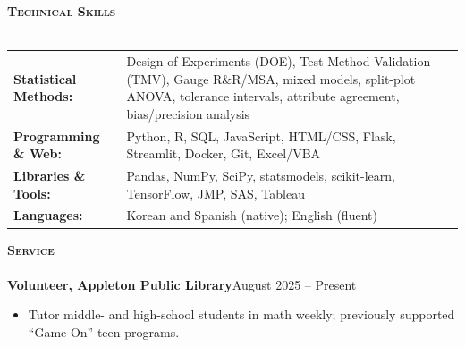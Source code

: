 \documentclass[a4paper]{article}
\newcommand{\lineunder}{
    \vspace*{-8pt} \\
    \hspace*{-18pt} \hrulefill \\
}
\newcommand{\header}[1]{
    \Needspace{4\baselineskip}
    {\hspace*{-18pt}\vspace*{5pt} \textsc{#1}}
    \vspace*{-6pt} \lineunder
}
\begin{document}
\vspace*{1mm}
\header{\textbf{Technical Skills}}
\begin{tabular}{@{}l >{\raggedright\arraybackslash}p{}@{}}
\textbf{Statistical Methods:} & Design of Experiments (DOE), Test Method Validation (TMV), Gauge R\&R/MSA, mixed models, split-plot ANOVA, tolerance intervals, attribute agreement, bias/precision analysis\\
\textbf{Programming \& Web:} & Python, R, SQL, JavaScript, HTML/CSS, Flask, Streamlit, Docker, Git, Excel/VBA\\
\textbf{Libraries \& Tools:} & Pandas, NumPy, SciPy, statsmodels, scikit-learn, TensorFlow, JMP, SAS, Tableau\\
\textbf{Languages:} & Korean and Spanish (native); English (fluent)
\end{tabular}

\vspace*{1mm}
\header{\textbf{Service}}
\textbf{Volunteer, Appleton Public Library}\hfill August 2025 -- Present
\begin{itemize}[noitemsep]
  \item Tutor middle- and high-school students in math weekly; previously supported ``Game On'' teen programs.
\end{itemize}
\end{document}
